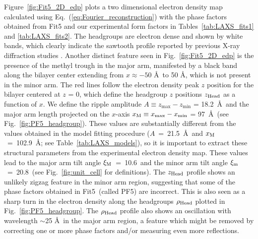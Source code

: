 Figure~\ref{fig:Fit5_2D_edp} plots a two dimensional electron density map calculated
using Eq.~(\ref{eq:Fourier_reconstruction})
with the phase factors obtained from Fit5  
and our experimental form factors in Tables~\ref{tab:LAXS_fits1} and \ref{tab:LAXS_fits2}.
The headgroups are electron dense and shown by white bands, which clearly indicate
the sawtooth profile reported by
previous X-ray diffraction studies \cite{ref:Sun96,ref:Sengupta03,ref:Pabst04}.
Another distinct feature seen in Fig.~\ref{fig:Fit5_2D_edp} is the 
presence of the methyl trough in the major arm, 
manifested by a black band along the bilayer center extending from 
$x \approx -50$ \AA\ to 50 \AA, which is not present in the minor arm.
The red lines follow the electron density peak $z$ position for the bilayer
centered at $z$ = 0, which define the headgroup $z$ positions $z_\text{Head}$ as a function of $x$.
We define the ripple amplitude $A \equiv z_\text{max}-z_\text{min}$ = 18.2~\AA\ 
and the major arm length projected on the $x$-axis 
$x_\textrm{M} \equiv x_\text{max}-x_\text{min}$ = 97~\AA\
(see Fig.~\ref{fig:PF5_headgroup}).
These values are substantially different from the values obtained in the model fitting 
procedure ($A$~=~21.5~\AA\ and $x_\textrm{M}$~=~102.9~\AA; see Table~\ref{tab:LAXS_models}), 
so it is important to extract these structural parameters from the 
experimental electron density map. 
These values lead to the major arm tilt angle $\xi_\text{M}$~=~10.6\textdegree\ and 
the minor arm tilt angle $\xi_\text{m}$~=~20.8\textdegree\
(see Fig.~\ref{fig:unit_cell} for definitions).
The $z_\text{Head}$ profile shows an unlikely zigzag feature in the minor arm region,
suggesting that some of the phase factors obtained in Fit5~(called PF5) are 
incorrect. This is also seen as a sharp turn in the electron density along the 
headgroups $\rho_\text{Head}$ plotted in Fig.~\ref{fig:PF5_headgroup}. 
The $\rho_\text{Head}$ profile also shows an oscillation with wavelength $\sim$25 \AA\
in the major arm region,
a feature which might be removed by correcting one or more phase factors and/or
measuring even more reflections.

